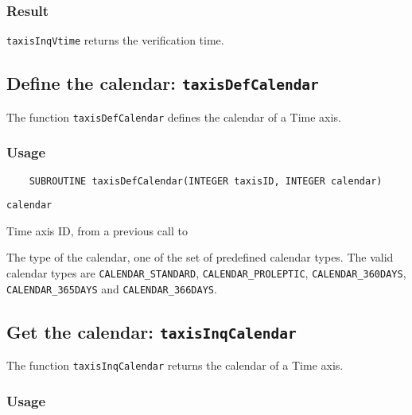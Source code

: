 \subsubsection*{Result}

{\tt taxisInqVtime} returns the verification time.



\subsection{Define the calendar: {\tt taxisDefCalendar}}
\label{taxisDefCalendar}

The function {\tt taxisDefCalendar} defines the calendar of a Time axis.

\subsubsection*{Usage}

\begin{verbatim}
    SUBROUTINE taxisDefCalendar(INTEGER taxisID, INTEGER calendar)
\end{verbatim}

\hspace*{4mm}\begin{minipage}[]{15cm}
\begin{deflist}{\tt calendar\ }
\item[{\tt taxisID}]
Time axis ID, from a previous call to {}
\item[{\tt calendar}]
The type of the calendar, one of the set of predefined {\CDI} calendar types.
                    The valid {\CDI} calendar types are {\tt CALENDAR\_STANDARD}, {\tt CALENDAR\_PROLEPTIC},
                    {\tt CALENDAR\_360DAYS}, {\tt CALENDAR\_365DAYS} and {\tt CALENDAR\_366DAYS}.

\end{deflist}
\end{minipage}


\subsection{Get the calendar: {\tt taxisInqCalendar}}
\label{taxisInqCalendar}

The function {\tt taxisInqCalendar} returns the calendar of a Time axis.

\subsubsection*{Usage}

